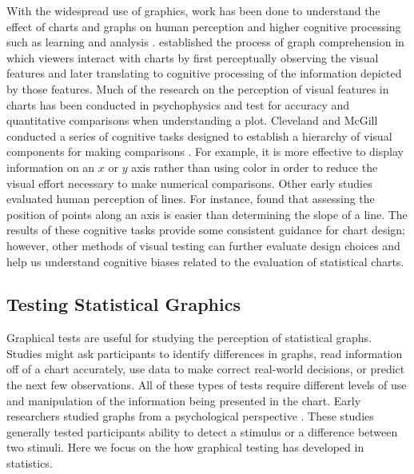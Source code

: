 \documentclass[12pt]{article}
\begin{document}
With the widespread use of graphics, work has been done to understand
the effect of charts and graphs on human perception and higher cognitive
processing such as learning and analysis \citep{green2009personal}.
\citet{carpenter1998model} established the process of graph
comprehension in which viewers interact with charts by first
perceptually observing the visual features and later translating to
cognitive processing of the information depicted by those features. Much
of the research on the perception of visual features in charts has been
conducted in psychophysics and test for accuracy and quantitative
comparisons when understanding a plot. Cleveland and McGill conducted a
series of cognitive tasks designed to establish a hierarchy of visual
components for making comparisons \citep{cleveland1984graphical}. For
example, it is more effective to display information on an \(x\) or
\(y\) axis rather than using color in order to reduce the visual effort
necessary to make numerical comparisons. Other early studies evaluated
human perception of lines. For instance, \citet{cleveland1985graphical}
found that assessing the position of points along an axis is easier than
determining the slope of a line. The results of these cognitive tasks
provide some consistent guidance for chart design; however, other
methods of visual testing can further evaluate design choices and help
us understand cognitive biases related to the evaluation of statistical
charts.

\hypertarget{testing-statistical-graphics}{%
\subsection{Testing Statistical
Graphics}\label{testing-statistical-graphics}}

Graphical tests are useful for studying the perception of statistical
graphs. Studies might ask participants to identify differences in
graphs, read information off of a chart accurately, use data to make
correct real-world decisions, or predict the next few observations. All
of these types of tests require different levels of use and manipulation
of the information being presented in the chart. Early researchers
studied graphs from a psychological perspective
\citep{spence1990visual, lewandowsky1989perception}. These studies
generally tested participants ability to detect a stimulus or a
difference between two stimuli. Here we focus on the how graphical
testing has developed in statistics.
\end{document}

